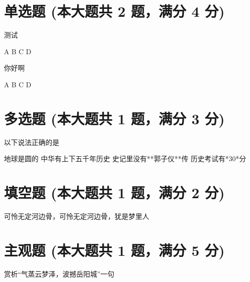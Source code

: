 \documentclass[12pt, a4paper, addpoints]{exam}
\begin{document}
\begin{center}
\end{center}
\vspace{5mm}

\normalsize
\vspace{5mm}

\section{单选题 (本大题共 2 题，满分 4 分)}
\hspace{1.5cm}
\begin{questions}
\question[2] 测试

\begin{oneparchoices}
\choice A
\choice B
\choice C
\choice D
\end{oneparchoices}

\question[2] 你好啊

\begin{oneparchoices}
\choice A
\choice B
\choice C
\choice D
\end{oneparchoices}

\end{questions}

\hspace{5cm}

\section{多选题 (本大题共 1 题，满分 3 分)}
\hspace{1.5cm}
\begin{questions}
\question[3] 以下说法正确的是

\begin{checkboxes}
\choice 地球是圆的
\choice 中华有上下五千年历史
\choice 史记里没有**郭子仪**传
\choice 历史考试有*30*分
\end{checkboxes}

\end{questions}

\hspace{5cm}

\section{填空题 (本大题共 1 题，满分 2 分)}
\hspace{1.5cm}
\begin{questions}
\question[2] 可怜无定河边骨，可怜无定河边骨，犹是\uline{\qquad\qquad\qquad\qquad}梦里人

\end{questions}

\hspace{5cm}

\section{主观题 (本大题共 1 题，满分 5 分)}
\hspace{1.5cm}
\begin{questions}
\question[5] 赏析“气蒸云梦泽，波撼岳阳城”一句

\end{questions}
\end{document}
